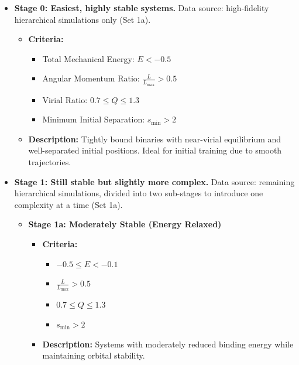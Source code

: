 \begin{itemize}

    \item \textbf{Stage 0: Easiest, highly stable systems.}  Data source: high-fidelity hierarchical simulations only (Set 1a). 
    \begin{itemize}
        \item \textbf{Criteria:}
        \begin{itemize}
            \item Total Mechanical Energy: $E < -0.5$
            \item Angular Momentum Ratio: $\frac{L}{L_{\max}} > 0.5$
            \item Virial Ratio: $0.7 \leq Q \leq 1.3$
            \item Minimum Initial Separation: $s_{\min} > 2$
        \end{itemize}
        \item \textbf{Description:} Tightly bound binaries with near-virial equilibrium and well-separated initial positions. Ideal for initial training due to smooth trajectories.
    \end{itemize}
    
    
    
    \item \textbf{Stage 1: Still stable but slightly more complex.} Data source: remaining hierarchical simulations, 
    divided into two sub-stages to introduce one complexity at a time (Set 1a).  

    \begin{itemize}
        \item \textbf{Stage 1a: Moderately Stable (Energy Relaxed)}
        \begin{itemize}
            \item \textbf{Criteria:}
            \begin{itemize}
                \item $-0.5 \leq E < -0.1$
                \item $\frac{L}{L_{\max}} > 0.5$
                \item $0.7 \leq Q \leq 1.3$
                \item $s_{\min} > 2$
            \end{itemize}
            \item \textbf{Description:} Systems with moderately reduced binding energy while maintaining orbital stability.
        \end{itemize}


\end{itemize}
\end{itemize}
